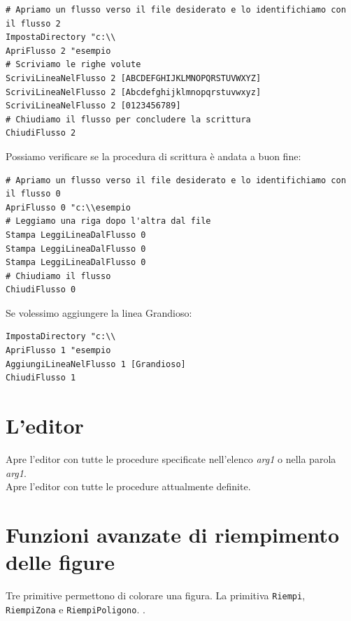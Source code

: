 \begin{lstlisting}[caption="Esempio di scrittura di un file"]
# Apriamo un flusso verso il file desiderato e lo identifichiamo con il flusso 2
ImpostaDirectory "c:\\
ApriFlusso 2 "esempio
# Scriviamo le righe volute
ScriviLineaNelFlusso 2 [ABCDEFGHIJKLMNOPQRSTUVWXYZ]
ScriviLineaNelFlusso 2 [Abcdefghijklmnopqrstuvwxyz]
ScriviLineaNelFlusso 2 [0123456789]
# Chiudiamo il flusso per concludere la scrittura
ChiudiFlusso 2
\end{lstlisting}

Possiamo verificare se la procedura di scrittura è andata a buon fine:
\begin{lstlisting}[caption="Esempio di lettura di un file"]
# Apriamo un flusso verso il file desiderato e lo identifichiamo con il flusso 0
ApriFlusso 0 "c:\\esempio
# Leggiamo una riga dopo l'altra dal file
Stampa LeggiLineaDalFlusso 0
Stampa LeggiLineaDalFlusso 0
Stampa LeggiLineaDalFlusso 0
# Chiudiamo il flusso
ChiudiFlusso 0
\end{lstlisting}
\noindent

Se volessimo aggiungere la linea \textquotedbl Grandioso:
\begin{lstlisting}[caption="Esempio di scrittura al termine di un file"]
ImpostaDirectory "c:\\
ApriFlusso 1 "esempio
AggiungiLineaNelFlusso 1 [Grandioso]
ChiudiFlusso 1
\end{lstlisting}



\section{L'editor}

Apre l'editor con tutte le procedure specificate nell'elenco \textit{arg1} o nella parola \textit{arg1}.\\

Apre l'editor con tutte le procedure attualmente definite.\\



\section{Funzioni avanzate di riempimento delle figure} 
Tre primitive permettono di colorare una figura. La primitiva \texttt{Riempi}, \texttt{RiempiZona} e \texttt{RiempiPoligono}.  .

